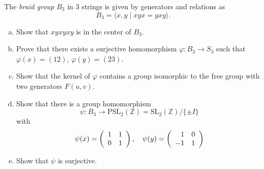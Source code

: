 \documentclass{article}
\newcounter{Problem}
\newenvironment{Problem}{\begin{Exercise}[name={Problem},
                                          counter={Problem}]}
                        {\end{Exercise}}
\begin{document}
\begin{Problem}
The \emph{braid group} $B_3$ in 3 strings is given by generators and
relations as
$$
B_3 = \langle x, y \mid xyx = yxy \rangle.
$$

\begin{enumerate}[(a)]
  \item{
    Show that $xyxyxy$ is in the center of $B_3$.
  }
  \item{
    Prove that there exists a surjective homomorphism
    $\varphi : B_3 \to S_3$ such that $\varphi(x) = (12)$,
    $\varphi(y) = (23)$.
  }
  \item{
    Show that the kernel of $\varphi$ contains a group isomorphic to
    the free group with two generators $F(u,v)$.
  }
  \item{
    Show that there is a group homomorphism
    $$
    \psi : B_3
       \to \mathrm{PSL}_2(\mathbb{Z})
         = \mathrm{SL}_2(\mathbb{Z}) / \{ \pm I \}
    $$
    with
    $$
    \psi(x) =
    \left(\begin{array}{r r}
      1 & 1 \\
      0 & 1
    \end{array}\right), \quad
    \psi(y) =
    \left(\begin{array}{r r}
      1 & 0 \\
     -1 & 1
    \end{array}\right)
    $$
  }
  \item{
    Show that $\psi$ is surjective.
  }
\end{enumerate}
\end{Problem}
\end{document}
